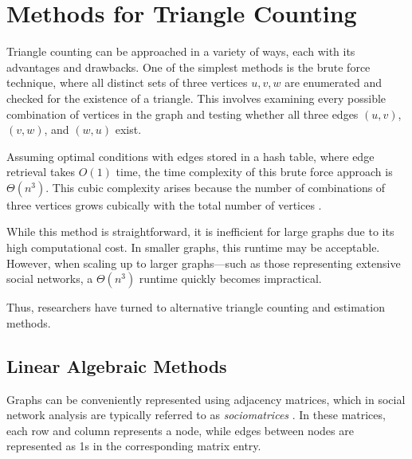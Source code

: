 \documentclass[12pt]{report}
\begin{document}
\section{Methods for Triangle Counting}

Triangle counting can be approached in a variety of ways, each with its advantages and drawbacks. 
One of the simplest methods is the brute force technique, where all distinct sets of three vertices ${u, v, w}$ are enumerated and checked for the existence of a triangle. This involves examining every possible combination of vertices in the graph and testing whether all three edges $(u, v)$, $(v, w)$, and $(w, u)$ exist. 

Assuming optimal conditions with edges stored in a hash table, where edge retrieval takes $O(1)$ time, the time complexity of this brute force approach is $\Theta(n^3)$. 
This cubic complexity arises because the number of combinations of three vertices grows cubically with the total number of vertices \cite{al_hasan_triangle_2018}. 

While this method is straightforward, it is inefficient for large graphs due to its high computational cost.
In smaller graphs, this runtime may be acceptable.
However, when scaling up to larger graphs—such as those representing extensive social networks, a $\Theta(n^3)$ runtime quickly becomes impractical.

Thus, researchers have turned to alternative triangle counting and estimation methods.

\subsection{Linear Algebraic Methods}

Graphs can be conveniently represented using adjacency matrices, which in social network analysis are typically referred to as \emph{sociomatrices} \cite{beum_method_1950}. 
In these matrices, each row and column represents a node, while edges between nodes are represented as 1s in the corresponding matrix entry.
\end{document}
